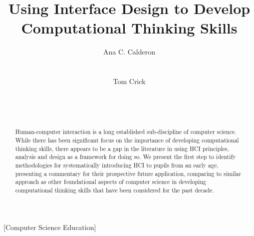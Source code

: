 \documentclass{sig-alternate}
\begin{document}
%

\title{Using Interface Design to Develop\\Computational Thinking Skills}


\author{
\alignauthor
Ana C. Calderon\\
\\
\\
\alignauthor
Tom Crick\\
\\
\\
\\
}

\maketitle

\begin{abstract}
Human-computer interaction is a long established sub-discipline of
computer science. While there has been significant focus on the
importance of developing computational thinking skills, there appears
to be a gap in the literature in using HCI principles, analysis and
design as a framework for doing so. We present the first step to
identify methodologies for systematically introducing HCI to pupils
from an early age, presenting a commentary for their prospective
future application, comparing to similar approach as other
foundational aspects of computer science in developing computational
thinking skills that have been considered for the past decade.
\end{abstract}

[Computer Science Education]
\end{document}
